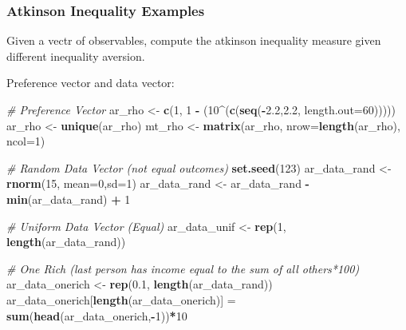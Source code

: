 \documentclass[
]{book}
\newenvironment{Shaded}{\begin{snugshade}}{\end{snugshade}}
\newcommand{\CommentTok}[1]{\textcolor[rgb]{0.56,0.35,0.01}{\textit{#1}}}
\newcommand{\DataTypeTok}[1]{\textcolor[rgb]{0.13,0.29,0.53}{#1}}
\newcommand{\DecValTok}[1]{\textcolor[rgb]{0.00,0.00,0.81}{#1}}
\newcommand{\FloatTok}[1]{\textcolor[rgb]{0.00,0.00,0.81}{#1}}
\newcommand{\KeywordTok}[1]{\textcolor[rgb]{0.13,0.29,0.53}{\textbf{#1}}}
\newcommand{\NormalTok}[1]{#1}
\newcommand{\OperatorTok}[1]{\textcolor[rgb]{0.81,0.36,0.00}{\textbf{#1}}}
\newcommand{\StringTok}[1]{\textcolor[rgb]{0.31,0.60,0.02}{#1}}
\begin{document}
\hypertarget{atkinson-inequality-examples}{%
\subsubsection{Atkinson Inequality Examples}\label{atkinson-inequality-examples}}

Given a vectr of observables, compute the atkinson inequality measure given different inequality aversion.

Preference vector and data vector:

\begin{Shaded}
\begin{Highlighting}[]
\CommentTok{\# Preference Vector }
\NormalTok{ar\_rho \textless{}{-}}\StringTok{ }\KeywordTok{c}\NormalTok{(}\DecValTok{1}\NormalTok{, }\DecValTok{1} \OperatorTok{{-}}\StringTok{ }\NormalTok{(}\DecValTok{10}\OperatorTok{\^{}}\NormalTok{(}\KeywordTok{c}\NormalTok{(}\KeywordTok{seq}\NormalTok{(}\OperatorTok{{-}}\FloatTok{2.2}\NormalTok{,}\FloatTok{2.2}\NormalTok{, }\DataTypeTok{length.out=}\DecValTok{60}\NormalTok{)))))}
\NormalTok{ar\_rho \textless{}{-}}\StringTok{ }\KeywordTok{unique}\NormalTok{(ar\_rho)}
\NormalTok{mt\_rho \textless{}{-}}\StringTok{ }\KeywordTok{matrix}\NormalTok{(ar\_rho, }\DataTypeTok{nrow=}\KeywordTok{length}\NormalTok{(ar\_rho), }\DataTypeTok{ncol=}\DecValTok{1}\NormalTok{)}
  
\CommentTok{\# Random Data Vector (not equal outcomes)}
\KeywordTok{set.seed}\NormalTok{(}\DecValTok{123}\NormalTok{)}
\NormalTok{ar\_data\_rand \textless{}{-}}\StringTok{ }\KeywordTok{rnorm}\NormalTok{(}\DecValTok{15}\NormalTok{, }\DataTypeTok{mean=}\DecValTok{0}\NormalTok{,}\DataTypeTok{sd=}\DecValTok{1}\NormalTok{)}
\NormalTok{ar\_data\_rand \textless{}{-}}\StringTok{ }\NormalTok{ar\_data\_rand }\OperatorTok{{-}}\StringTok{ }\KeywordTok{min}\NormalTok{(ar\_data\_rand) }\OperatorTok{+}\StringTok{ }\DecValTok{1}

\CommentTok{\# Uniform Data Vector (Equal)}
\NormalTok{ar\_data\_unif \textless{}{-}}\StringTok{ }\KeywordTok{rep}\NormalTok{(}\DecValTok{1}\NormalTok{, }\KeywordTok{length}\NormalTok{(ar\_data\_rand))}

\CommentTok{\# One Rich (last person has income equal to the sum of all others*100)}
\NormalTok{ar\_data\_onerich \textless{}{-}}\StringTok{ }\KeywordTok{rep}\NormalTok{(}\FloatTok{0.1}\NormalTok{, }\KeywordTok{length}\NormalTok{(ar\_data\_rand))}
\NormalTok{ar\_data\_onerich[}\KeywordTok{length}\NormalTok{(ar\_data\_onerich)] =}\StringTok{ }\KeywordTok{sum}\NormalTok{(}\KeywordTok{head}\NormalTok{(ar\_data\_onerich,}\OperatorTok{{-}}\DecValTok{1}\NormalTok{))}\OperatorTok{*}\DecValTok{10}
\end{Highlighting}
\end{Shaded}
\end{document}
